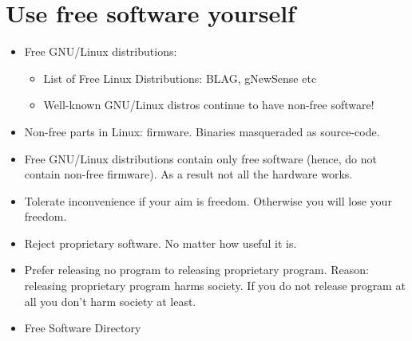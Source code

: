\documentclass[twoside,openright]{report}
\begin{document}
\section{Use free software yourself}
\begin{itemize}
 \item     Free GNU/Linux distributions:
\begin{itemize}
 \item         List of Free Linux Distributions: BLAG, gNewSense etc
 \item         Well-known GNU/Linux distros continue to have non-free software!
\end{itemize}
 \item     Non-free parts in Linux: firmware. Binaries masqueraded as source-code.
 \item     Free GNU/Linux distributions contain only free software (hence, do not contain non-free firmware). As a result not all the hardware works.
 \item     Tolerate inconvenience if your aim is freedom. Otherwise you will lose your freedom.
 \item     Reject proprietary software. No matter how useful it is.
 \item     Prefer releasing no program to releasing proprietary program. Reason: releasing proprietary program harms society. If you do not release program at all you don't harm society at least.
 \item     Free Software Directory
\end{itemize}
\end{document}
